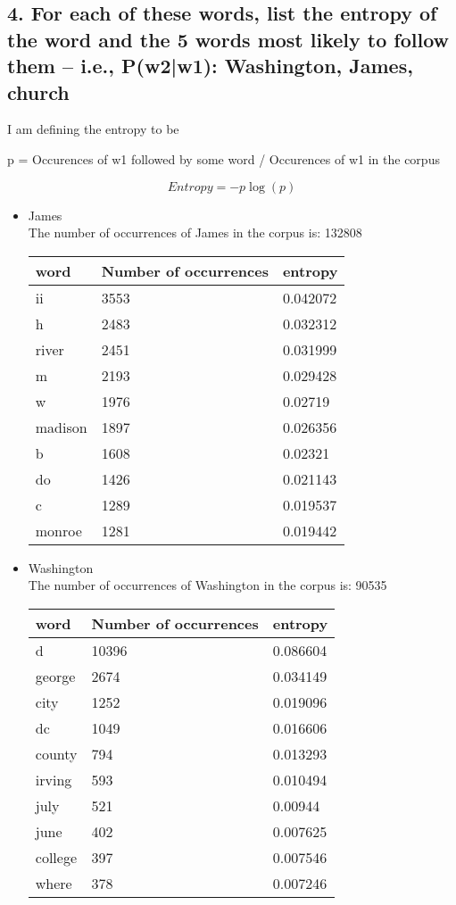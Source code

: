 \documentclass[12pt,letterpaper]{article}
\begin{document}
\subsection*{4. For each of these words, list the entropy of the word and the 5 words most likely to follow them -- i.e., P(w2|w1): Washington, James, church}

I am defining the entropy to be

p = Occurences of w1 followed by some word / Occurences of w1 in the corpus

\begin{equation*}
Entropy = -p\log(p)
\end{equation*}
\begin{itemize}
\item James \\

The number of occurrences of James in the corpus is: 132808


\begin{tabular}{| p{5cm} | p{5cm} | p{5cm} |}
    \hline 
    word & Number of occurrences & entropy \\ \hline
    ii & 3553 & 0.042072  \\
    h & 2483 & 0.032312  \\
    river & 2451 & 0.031999  \\
    m & 2193 & 0.029428  \\
    w & 1976 & 0.02719  \\
    madison & 1897 & 0.026356  \\
    b & 1608 & 0.02321  \\
    do & 1426 & 0.021143  \\
    c & 1289 & 0.019537  \\
    monroe & 1281 & 0.019442  \\
    \hline
\end{tabular}

\item Washington \\
The number of occurrences of Washington in the corpus is: 90535


\begin{tabular}{| p{5cm} | p{5cm} | p{5cm} |}
    \hline 
    word & Number of occurrences & entropy \\ \hline
    d & 10396 & 0.086604  \\
    george & 2674 & 0.034149  \\
    city & 1252 & 0.019096  \\
    dc & 1049 & 0.016606  \\
    county & 794 & 0.013293  \\
    irving & 593 & 0.010494  \\
    july & 521 & 0.00944  \\
    june & 402 & 0.007625  \\
    college & 397 & 0.007546  \\
    where & 378 & 0.007246  \\
    \hline
\end{tabular}
 


\end{itemize}
\end{document}
